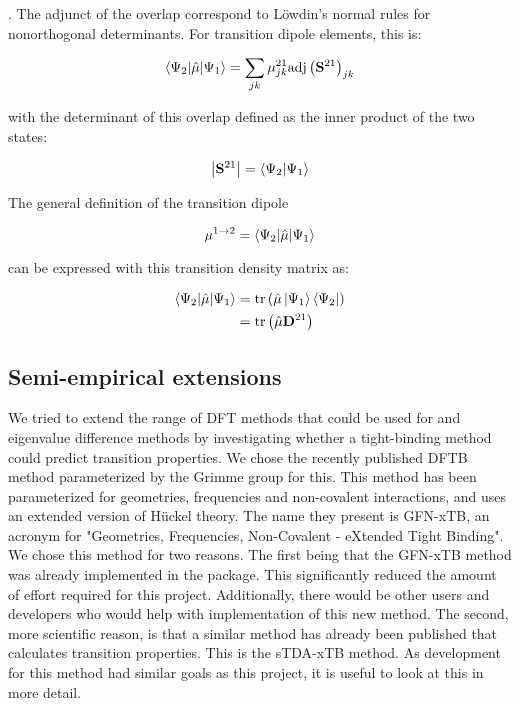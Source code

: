 . The adjunct of the overlap correspond to L{\"o}wdin's normal rules for nonorthogonal
determinants. For transition dipole elements, this is:

\begin{equation}
\braket{\Psi_2|\hat{\mathbf{\mu}}|\Psi_1} = \sum_{jk} \mathbf{\mu}_{jk}^{21} \text{adj} \left( \mathbf{S}^{21}\right)_{jk}
\end{equation}

with the determinant of this overlap defined as the inner product of the two states:

\begin{equation}
\left\lvert {\mathbf{S}^{21}} \right\rvert = \braket{\Psi_2|\Psi_1}
\end{equation}


The general definition of the transition dipole

\begin{equation}
\mathbf{\mu}^{1\rightarrow2} = \braket{\Psi_2|\hat{\mathbf{\mu}}|\Psi_1}
\end{equation}

can be expressed with this transition density matrix as:

\begin{equation}
\begin{split}    
\braket{\Psi_2|\hat{\mathbf{\mu}}|\Psi_1} &= \text{tr}\left(\hat{\mathbf{\mu}} \ket{\Psi_1} \bra{\Psi_2} \right) \\
&= \text{tr}\left( \hat{\mathbf{\mu}} \mathbf{D}^{21}\right)
\end{split}
\end{equation}

\subsection{Semi-empirical extensions}
\label{subsec:dscf_xtb}
We tried to extend the range of DFT methods that could be used for \dscf and 
eigenvalue difference methods by investigating whether a tight-binding method
could predict transition properties.
We chose the recently published DFTB method parameterized by the Grimme group for
this. This method has been parameterized for geometries, frequencies and non-covalent
interactions, and uses an extended version of H{\"u}ckel theory. The name they
present is GFN-xTB, an acronym for "Geometries, Frequencies, Non-Covalent - eXtended 
Tight Binding".
We chose this method for two reasons. The first being that the GFN-xTB method was
already implemented in the  package. This significantly reduced the
amount of effort required for this project. Additionally, there would be other
users and developers who would help with implementation of this new method.
The second, more scientific reason, is that a similar method has already been
published that calculates transition properties. This is the sTDA-xTB method. 
As development for this method had similar goals as this project, it is useful
to look at this in more detail.

